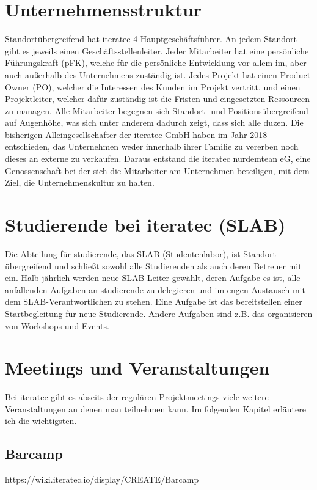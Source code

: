 \section{Unternehmensstruktur}
Standortübergreifend hat iteratec 4 Hauptgeschäftsführer. An jedem Standort gibt es jeweils einen Geschäftsstellenleiter. Jeder Mitarbeiter hat eine persönliche 
Führungskraft (pFK), welche für die persönliche Entwicklung vor allem im, aber auch außerhalb des Unternehmens zuständig ist. Jedes Projekt hat einen Product Owner (PO), 
welcher die Interessen des Kunden im Projekt vertritt, und einen Projektleiter, welcher dafür zuständig ist die Fristen und eingesetzten Ressourcen zu managen.
Alle Mitarbeiter begegnen sich Standort- und Positionsübergreifend auf Augenhöhe, was sich unter anderem dadurch zeigt, dass sich alle duzen.
Die bisherigen Alleingesellschafter der iteratec GmbH haben im Jahr 2018 entschieden, das Unternehmen weder innerhalb ihrer Familie zu vererben noch dieses an externe zu verkaufen. 
Daraus entstand die iteratec nurdemtean eG, eine Genossenschaft bei der sich die Mitarbeiter am Unternehmen beteiligen, mit dem Ziel, die Unternehmenskultur zu halten.

\section{Studierende bei iteratec (SLAB)}
Die Abteilung für studierende, das SLAB (Studentenlabor), ist Standort übergreifend und schließt sowohl alle Studierenden als auch deren Betreuer mit ein. 
Halb-jährlich werden neue SLAB Leiter gewählt, deren Aufgabe es ist, alle anfallenden Aufgaben an studierende zu delegieren und im engen Austausch mit dem SLAB-Verantwortlichen zu stehen. 
Eine Aufgabe ist das bereitstellen einer Startbegleitung für neue Studierende. Andere Aufgaben sind z.B. das organisieren von Workshops und Events.


\section{Meetings und Veranstaltungen}
Bei iteratec gibt es abseits der regulären Projektmeetings viele weitere Veranstaltungen an denen man teilnehmen kann. Im folgenden Kapitel erläutere ich die wichtigsten.

\subsection{Barcamp}
https://wiki.iteratec.io/display/CREATE/Barcamp

